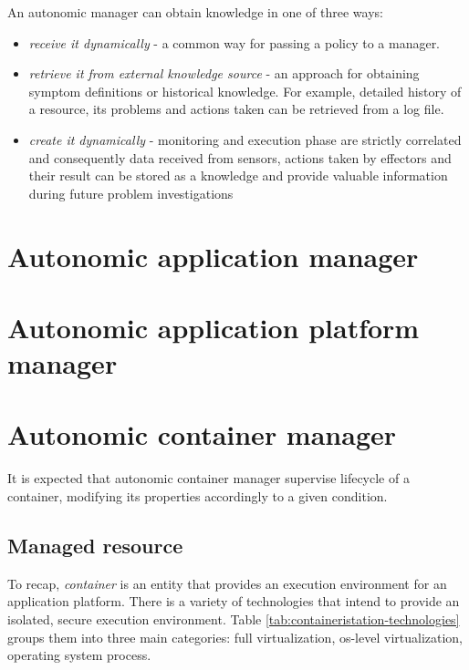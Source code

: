 An autonomic manager can obtain knowledge in one of three ways:
\begin{itemize}
 \item \emph{receive it dynamically} - a common way for passing a policy to a manager. 
 \item \emph{retrieve it from external knowledge source} - an approach for obtaining symptom definitions or historical knowledge. For example, detailed history of a resource, its problems and actions taken can be retrieved from a log file.
 \item \emph{create it dynamically} - monitoring and execution phase are strictly correlated and consequently data received from sensors, actions taken by effectors and their result can be stored as a knowledge and provide valuable information during future problem investigations
\end{itemize}


\section{Autonomic application manager}

\section{Autonomic application platform manager}

\section{Autonomic container manager}
It is expected that autonomic container manager supervise lifecycle of a container, modifying its properties accordingly to a given condition.

\subsection{Managed resource}
To recap, \emph{container} is an entity that provides an execution environment for an application platform. There is a variety of technologies that intend to provide an isolated, secure execution environment. Table \ref{tab:containeristation-technologies} groups them into three main categories: full virtualization, os-level virtualization, operating system process.

